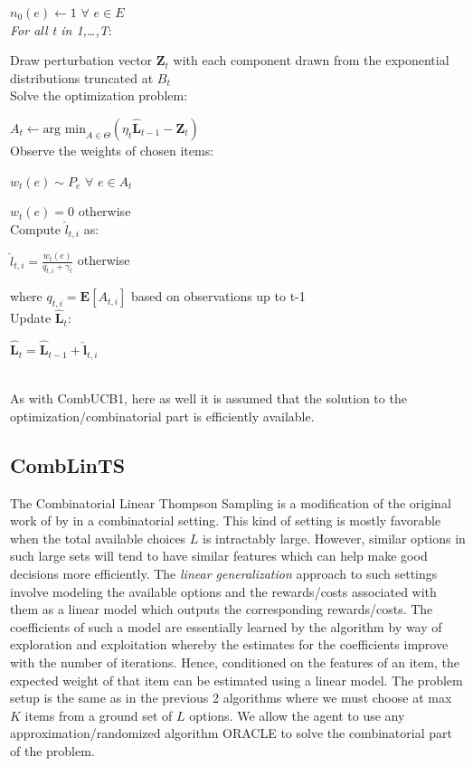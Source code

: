 $n_0(e) \leftarrow 1$ $\forall$ $e \in E$\\

\noindent \textit{For all t in 1,\ldots,T}:

Draw perturbation vector $\mathbf{Z}_t$ with each component drawn from the exponential distributions truncated at $B_t$\\

Solve the optimization problem:

\indent \indent $A_t \leftarrow \textrm{arg min}_{A\in \Theta}(\eta_t\mathbf{\hat{L}}_{t-1}-\mathbf{Z}_t)$\\

Observe the weights of chosen items:

\indent \indent $w_t(e) \sim P_e$ $\forall$ $e \in A_t$

\indent \indent $w_t(e)=0$ otherwise\\

Compute $\hat{l}_{t,i}$ as:

\indent \indent $\hat{l}_{t,i}=\frac{w_t(e)}{q_{t,i}+\gamma_t}$ otherwise

\indent \indent where $q_{t,i}=\textbf{E}[A_{t,i}]$ based on observations up to t-1\\

Update $\mathbf{\hat{L}}_t$:

\indent \indent $\mathbf{\hat{L}}_t=\mathbf{\hat{L}}_{t-1}+\mathbf{\hat{l}}_{t,i}$

\noindent \hrulefill\\

As with CombUCB1, here as well it is assumed that the solution to the optimization/combinatorial part is efficiently available.

\subsection{CombLinTS}

The Combinatorial Linear Thompson Sampling is a modification of the original work of \cite{thompson1933} by \cite{wen2015efficient} in a combinatorial setting. This kind of setting is mostly favorable when the total available choices $L$ is intractably large. However, similar options in such large sets will tend to have similar features which can help make good decisions more efficiently. The \emph{linear generalization} approach to such settings involve modeling the available options and the rewards/costs associated with them as a linear model which outputs the corresponding rewards/costs. The coefficients of such a model are essentially learned by the algorithm by way of exploration and exploitation whereby the estimates for the coefficients improve with the number of iterations. Hence, conditioned on the features of an item, the expected weight of that item can be estimated using a linear model. The problem setup is the same as in the previous 2 algorithms where we must choose at max $K$ items from a ground set of $L$ options. We allow the agent to use any approximation/randomized algorithm ORACLE to solve the combinatorial part of the problem.\\

